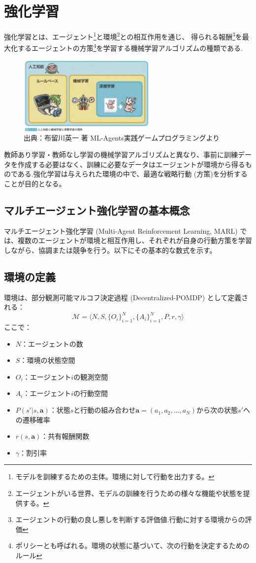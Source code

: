 \section{強化学習}
強化学習とは、エージェント\footnote{モデルを訓練するための主体。環境に対して行動を出力する。}と環境\footnote{エージェントがいる世界、モデルの訓練を行うための様々な機能や状態を提供する。}との相互作用を通じ、
得られる報酬\footnote{エージェントの行動の良し悪しを判断する評価値.行動に対する環境からの評価}を最大化するエージェントの方策\footnote{ポリシーとも呼ばれる。環境の状態に基づいて、次の行動を決定するための
ルール}を学習する機械学習アルゴリズムの種類である.
\begin{figure}[H] 
  \centering 
  \includegraphics[width=0.6\textwidth]{Figures/IntroReinforce.png}
  \caption{出典：布留川英一 著 ML-Agents実践ゲームプログラミングより} 
  \label{fig:01} 
\end{figure}
教師あり学習・教師なし学習の機械学習アルゴリズムと異なり、事前に訓練データを作成する必要はなく、訓練に必要なデータはエージェントが環境から得るものである.強化学習は与えられた環境の中で、最適な戦略行動 (方策)を分析することが目的となる。

\subsection{マルチエージェント強化学習の基本概念}

マルチエージェント強化学習 (Multi-Agent Reinforcement Learning, MARL) では、複数のエージェントが環境と相互作用し、それぞれが自身の行動方策を学習しながら、協調または競争を行う。以下にその基本的な数式を示す。

\subsection*{環境の定義}
環境は、部分観測可能マルコフ決定過程 (Decentralized-POMDP) として定義される：
\[
\mathcal{M} = \langle N, S, \{O_i\}_{i=1}^N, \{A_i\}_{i=1}^N, P, r, \gamma \rangle
\]
ここで：
\begin{itemize}
    \item $N$：エージェントの数
    \item $S$：環境の状態空間
    \item $O_i$：エージェント$i$の観測空間
    \item $A_i$：エージェント$i$の行動空間
    \item $P(s' | s, \boldsymbol{a})$：状態$s$と行動の組み合わせ$\boldsymbol{a} = (a_1, a_2, \dots, a_N)$から次の状態$s'$への遷移確率
    \item $r(s, \boldsymbol{a})$：共有報酬関数
    \item $\gamma$：割引率
\end{itemize}

